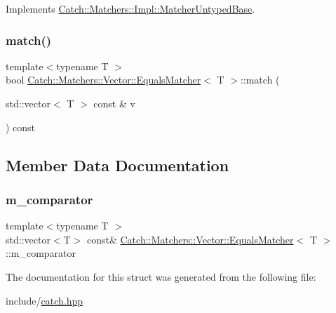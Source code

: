 Implements \mbox{\hyperlink{class_catch_1_1_matchers_1_1_impl_1_1_matcher_untyped_base_a91d3a907dbfcbb596077df24f6e11fe2}{Catch\+::\+Matchers\+::\+Impl\+::\+Matcher\+Untyped\+Base}}.

\mbox{\label{struct_catch_1_1_matchers_1_1_vector_1_1_equals_matcher_aca444c319d1b4c6f538faf9c4735da04}} 
\subsubsection{\texorpdfstring{match()}{match()}}
{\footnotesize\ttfamily template$<$typename T $>$ \\
bool \mbox{\hyperlink{struct_catch_1_1_matchers_1_1_vector_1_1_equals_matcher}{Catch\+::\+Matchers\+::\+Vector\+::\+Equals\+Matcher}}$<$ T $>$\+::match (\begin{DoxyParamCaption}\item[{std\+::vector$<$ T $>$ const \&}]{v }\end{DoxyParamCaption}) const\hspace{0.3cm}{\ttfamily [inline]}}



\subsection{Member Data Documentation}
\mbox{\label{struct_catch_1_1_matchers_1_1_vector_1_1_equals_matcher_a56f7aa6f110a12b1b9aeb0cabbc9d755}} 
\subsubsection{\texorpdfstring{m\+\_\+comparator}{m\_comparator}}
{\footnotesize\ttfamily template$<$typename T $>$ \\
std\+::vector$<$T$>$ const\& \mbox{\hyperlink{struct_catch_1_1_matchers_1_1_vector_1_1_equals_matcher}{Catch\+::\+Matchers\+::\+Vector\+::\+Equals\+Matcher}}$<$ T $>$\+::m\+\_\+comparator}



The documentation for this struct was generated from the following file\+:\begin{DoxyCompactItemize}
\item 
include/\mbox{\hyperlink{catch_8hpp}{catch.\+hpp}}\end{DoxyCompactItemize}
